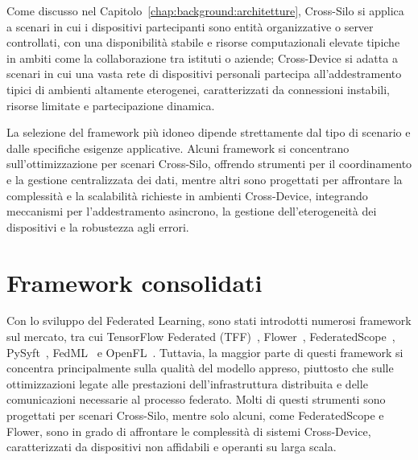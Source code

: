 \documentclass[a4paper, oneside, openright]{report}
\let\oldsection\section
\renewcommand{\section}{\newpage\oldsection}
\begin{document}
Come discusso nel Capitolo~\ref{chap:background:architetture}, Cross-Silo si  applica a scenari in cui i dispositivi partecipanti sono entità organizzative o server controllati, con una disponibilità stabile e risorse computazionali elevate tipiche in ambiti come la collaborazione tra istituti o aziende; Cross-Device si adatta a scenari in cui una vasta rete di dispositivi personali partecipa all'addestramento tipici di ambienti altamente eterogenei, caratterizzati da connessioni instabili, risorse limitate e partecipazione dinamica.

La selezione del framework più idoneo dipende strettamente dal tipo di scenario e dalle specifiche esigenze applicative. Alcuni framework si concentrano sull'ottimizzazione per scenari Cross-Silo, offrendo strumenti per il coordinamento e la gestione centralizzata dei dati, mentre altri sono progettati per affrontare la complessità e la scalabilità richieste in ambienti Cross-Device, integrando meccanismi per l'addestramento asincrono, la gestione dell'eterogeneità dei dispositivi e la robustezza agli errori.

\section{Framework consolidati}





Con lo sviluppo del Federated Learning, sono stati introdotti numerosi framework sul mercato, tra cui TensorFlow Federated (TFF)~\cite{tff}, Flower~\cite{flower}, FederatedScope~\cite{federated-scope}, PySyft~\cite{pysyft}, FedML~\cite{fedml} e OpenFL~\cite{}. Tuttavia, la maggior parte di questi framework si concentra principalmente sulla qualità del modello appreso, piuttosto che sulle ottimizzazioni legate alle prestazioni dell'infrastruttura distribuita e delle comunicazioni necessarie al processo federato. Molti di questi strumenti sono progettati per scenari Cross-Silo, mentre solo alcuni, come FederatedScope e Flower, sono in grado di affrontare le complessità di sistemi Cross-Device, caratterizzati da dispositivi non affidabili e operanti su larga scala.
\end{document}
